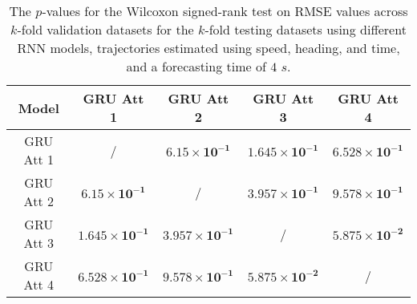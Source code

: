 \begin{table}[!ht]
	\centering
	\begin{tabular}{|c|c|c|c|c|}
		\hline
		Model & GRU Att 1 & GRU Att 2 & GRU Att 3 & GRU Att 4 \\ \hline
		GRU Att 1 & / & $\mathbf{6.15 \times 10^{-1}}$ & $\mathbf{1.645 \times 10^{-1}}$ & $\mathbf{6.528 \times 10^{-1}}$ \\ \hline
		GRU Att 2 & $\mathbf{6.15 \times 10^{-1}}$ & / & $\mathbf{3.957 \times 10^{-1}}$ & $\mathbf{9.578 \times 10^{-1}}$ \\ \hline
		GRU Att 3 & $\mathbf{1.645 \times 10^{-1}}$ & $\mathbf{3.957 \times 10^{-1}}$ & / & $\mathbf{5.875 \times 10^{-2}}$ \\ \hline
		GRU Att 4 & $\mathbf{6.528 \times 10^{-1}}$ & $\mathbf{9.578 \times 10^{-1}}$ & $\mathbf{5.875 \times 10^{-2}}$ & / \\ \hline
	\end{tabular}
	\caption{The $p$-values for the Wilcoxon signed-rank test on RMSE values across $k$-fold validation datasets for the $k$-fold testing datasets using different RNN models, trajectories estimated using speed, heading, and time, and a forecasting time of $4$ $s$.}
	\label{tab:RMSE:speed:actual:dir:p:4}
\end{table}

